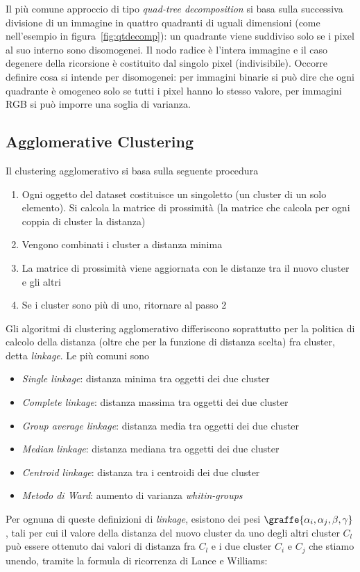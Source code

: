 \documentclass[\main/main.tex]{subfiles}
\begin{document}
Il più comune approccio di tipo \textit{quad-tree decomposition} si basa sulla successiva divisione di un immagine in quattro quadranti di uguali dimensioni (come nell'esempio in figura~\ref{fig:qtdecomp}): un quadrante viene suddiviso solo se i pixel al suo interno sono disomogenei. Il nodo radice è l'intera immagine e il caso degenere della ricorsione è costituito dal singolo pixel (indivisibile). Occorre definire cosa si intende per disomogenei: per immagini binarie si può dire che ogni quadrante è omogeneo solo se tutti i pixel hanno lo stesso valore, per immagini RGB si può imporre una soglia di varianza.

\subsection{Agglomerative Clustering}
Il clustering agglomerativo si basa sulla seguente procedura \begin{enumerate}
	\item Ogni oggetto del dataset costituisce un singoletto (un cluster di un solo elemento). Si calcola la matrice di prossimità (la matrice che calcola per ogni coppia di cluster la distanza)
	\item Vengono combinati i cluster a distanza minima
	\item La matrice di prossimità viene aggiornata con le distanze tra il nuovo cluster e gli altri
	\item Se i cluster sono più di uno, ritornare al passo 2
\end{enumerate}
Gli algoritmi di clustering agglomerativo differiscono soprattutto per la politica di calcolo della distanza (oltre che per la funzione di distanza scelta) fra cluster, detta \textit{linkage}. Le più comuni sono\begin{itemize}
	\item \textit{Single linkage}: distanza minima tra oggetti dei due cluster
	\item \textit{Complete linkage}: distanza massima tra oggetti dei due cluster
	\item \textit{Group average linkage}: distanza media tra oggetti dei due cluster
	\item \textit{Median linkage}: distanza mediana tra oggetti dei due cluster
	\item \textit{Centroid linkage}: distanza tra i centroidi dei due cluster
	\item \textit{Metodo di Ward}: aumento di varianza \textit{whitin-groups}
\end{itemize}
Per ognuna di queste definizioni di \textit{linkage}, esistono dei pesi $\graffe{ \alpha_i , \alpha_j , \beta , \gamma }$, tali per cui il valore della distanza del nuovo cluster da uno degli altri cluster $C_l$ può essere ottenuto dai valori di distanza fra $C_l$ e i due cluster $C_i$ e $C_j$ che stiamo unendo, tramite la formula di ricorrenza di Lance e Williams:
\end{document}
